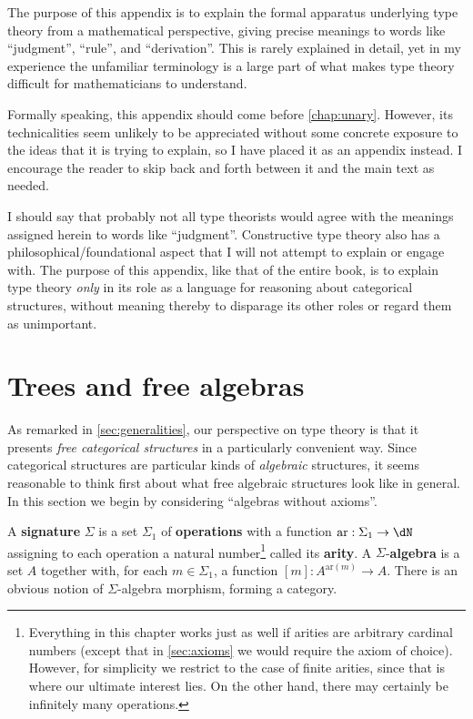 \documentclass{book}
\def\ay{\mathrm{ar}}
\def\sig{\Sigma}
\def\act#1{[#1]}
\begin{document}
The purpose of this appendix is to explain the formal apparatus underlying type theory from a mathematical perspective, giving precise meanings to words like ``judgment'', ``rule'', and ``derivation''.
This is rarely explained in detail, yet in my experience the unfamiliar terminology is a large part of what makes type theory difficult for mathematicians to understand.

Formally speaking, this appendix should come before \cref{chap:unary}.
However, its technicalities seem unlikely to be appreciated without some concrete exposure to the ideas that it is trying to explain, so I have placed it as an appendix instead.
I encourage the reader to skip back and forth between it and the main text as needed.

I should say that probably not all type theorists would agree with the meanings assigned herein to words like ``judgment''.
Constructive type theory also has a philosophical/foundational aspect that I will not attempt to explain or engage with.
The purpose of this appendix, like that of the entire book, is to explain type theory \emph{only} in its role as a language for reasoning about categorical structures, without meaning thereby to disparage its other roles or regard them as unimportant.


\section{Trees and free algebras}
\label{sec:trees}

As remarked in \cref{sec:generalities}, our perspective on type theory is that it presents \emph{free categorical structures} in a particularly convenient way.
Since categorical structures are particular kinds of \emph{algebraic} structures, it seems reasonable to think first about what free algebraic structures look like in general.
In this section we begin by considering ``algebras without axioms''.

A \textbf{signature} $\sig$ is a set $\sig_1$ of \textbf{operations} with a function $\ay:\sig_1 \to \dN$ assigning to each operation a natural number\footnote{Everything in this chapter works just as well if arities are arbitrary cardinal numbers (except that in \cref{sec:axioms} we would require the axiom of choice).
  However, for simplicity we restrict to the case of finite arities, since that is where our ultimate interest lies.
  On the other hand, there may certainly be infinitely many operations.} called its \textbf{arity}.
A $\sig$-\textbf{algebra} is a set $A$ together with, for each $m\in\sig_1$, a function $\act m :A^{\ay(m)} \to A$.
There is an obvious notion of $\sig$-algebra morphism, forming a category.
\end{document}
